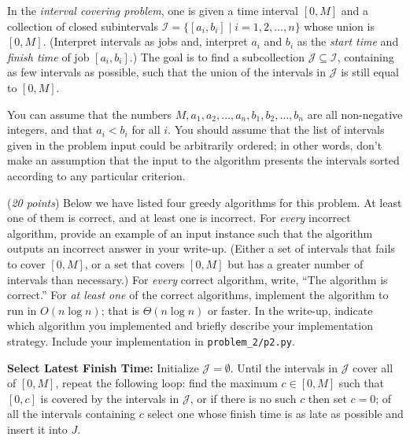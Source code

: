 \documentclass{hw}
\begin{document}
\newpage

\begin{problem}
    In the {\em interval covering problem}, one is given a time interval $[0,M]$ and a collection of closed subintervals $\mathcal{I} = \{[a_i,b_i] \mid i=1,2,\ldots,n\}$ whose union is $[0,M]$. (Interpret intervals as jobs and, interpret $a_i$ and $b_i$ as the {\em start time} and {\em finish time} of job $[a_i,b_i]$.) The goal is to find a subcollection $\mathcal{J} \subseteq \mathcal{I}$, containing as few intervals as possible, such that the union of the intervals in $\mathcal{J}$ is still equal to $[0,M]$.
    
    You can assume that the numbers $M,a_1,a_2,\ldots,a_n,b_1,b_2,\ldots,b_n$ are all non-negative integers, and that $a_i < b_i$ for all $i$. You should assume that the list of intervals given in the problem input could be arbitrarily ordered; in other words, don't make an assumption that the input to the algorithm presents the intervals
    sorted according to any particular criterion.
    
    (\textit{20 points}) Below we have listed four greedy algorithms for this problem. At least one of them is correct, and at least one is incorrect. For {\em every} incorrect algorithm, provide an example of an input instance such that the algorithm outputs an incorrect answer in your write-up. (Either a set of intervals that fails to cover $[0,M]$, or a set that covers $[0,M]$ but has a greater number of intervals than necessary.) For {\em every} correct algorithm, write, ``The algorithm is correct.'' For {\em at least one} of the correct algorithms, implement the algorithm to run in $O(n \log n)$; that is $\Theta(n \log n)$ or faster. In the write-up, indicate which algorithm you implemented and briefly describe your implementation strategy. Include your implementation in \texttt{problem\_2/p2.py}.
        \begin{subproblem}
            \textbf{Select Latest Finish Time:} Initialize $\mathcal{J}=\emptyset$. Until the intervals in $\mathcal{J}$ cover all of $[0,M]$, repeat the following loop: find the maximum $c \in [0,M]$ such that $[0,c]$ is covered by the intervals in $\mathcal{J}$, or if there is no such $c$ then set $c=0$; of all the intervals containing $c$ select one whose finish time is as late as possible and insert it into $J$.
        \end{subproblem}
    

\end{problem}
\end{document}
